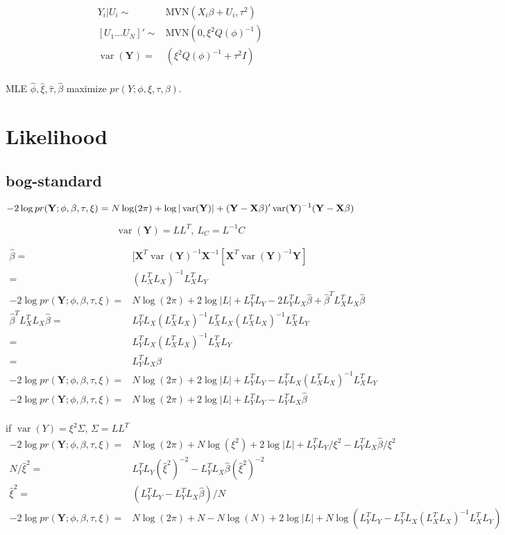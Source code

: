 \documentclass[12pt]{article}
\DeclareMathOperator{\var}{var}
\begin{document}
\begin{align*}
Y_i| U_i \sim & \text{MVN}(X_i\beta + U_i, \tau^2 )\\
[U_1 \ldots U_N]' \sim  & \text{MVN}(0, \xi^2 Q(\phi)^{-1})\\
\var(\mathbf{Y})  = &  ( \xi^2 Q(\phi)^{-1} + \tau^2 I  )  \\
\end{align*}

MLE  $\hat\phi, \hat\xi, \hat\tau,\hat\beta$  maximize $pr(Y ;
\phi,\xi,\tau,\beta)$.

\section*{Likelihood}
\subsection{bog-standard}
\[
-2 \log pr(\mathbf{Y};\phi,\beta,\tau,\xi) = N \log(2\pi) + 
\log| \var(\mathbf{Y})  | + \\
( \mathbf{Y} -\mathbf{X}\beta)  '
  \var(\mathbf{Y})^{-1}
(\mathbf{Y} - \mathbf{X}\beta)
\]

\[	
\var(\mathbf{Y}) = L L^T,\ L_C = L^{-1}C 
\]

\begin{align*}
\hat\beta = &[\mathbf{X}^T
  \var(\mathbf{Y})^{-1} \mathbf{X}^{-1}
  [\mathbf{X}^T
  \var(\mathbf{Y})^{-1} \mathbf{Y}]\\
  = & (L_X^TL_X)^{-1} L_X^TL_Y\\
-2 \log pr(\mathbf{Y};\phi,\beta,\tau,\xi) = &N \log(2\pi) +
2\log| L  | + L_Y^TL_Y -2L_Y^TL_X\hat\beta + \hat\beta^T L_X^TL_X\hat\beta\\
\hat\beta^T  L_X^TL_X\hat\beta = & L_Y^TL_X (L_X^TL_X)^{-1}  L_X^TL_X (L_X^TL_X)^{-1} L_X^TL_Y \\
 = &   L_Y^TL_X (L_X^TL_X)^{-1} L_X^TL_Y \\
= & L_Y^TL_X\hat\beta\\
-2 \log pr(\mathbf{Y};\phi,\beta,\tau,\xi) = &N \log(2\pi) +
2\log| L  | + L_Y^TL_Y -L_Y^TL_X(L_X^TL_X)^{-1} L_X^TL_Y \\
-2 \log pr(\mathbf{Y};\phi,\beta,\tau,\xi) = &N \log(2\pi) +
2\log| L  | + L_Y^TL_Y- L_Y^TL_X\hat\beta\\
\end{align*}

if $\var(Y) = \xi^2 \Sigma$, $\Sigma = L L^T$
\begin{align*}
-2 \log pr(\mathbf{Y};\phi,\beta,\tau,\xi) = &N \log(2\pi) +
N \log(\xi^2) + 2\log| L  | + L_Y^TL_Y/\xi^2 -L_Y^TL_X\hat\beta/\xi^2 \\
N/\hat\xi^2 = &L_Y^TL_Y(\hat\xi^2)^{-2} - L_Y^TL_X\hat\beta(\hat\xi^2)^{-2}\\
\hat\xi^2 = &(L_Y^TL_Y - L_Y^TL_X\hat\beta)/N\\
-2 \log pr(\mathbf{Y};\phi,\beta,\tau,\xi) = &N \log(2\pi) +N- N \log(N) 	+ 2\log| L  | +
N\log(L_Y^TL_Y - L_Y^TL_X(L_X^TL_X)^{-1} L_X^TL_Y)
\end{align*}
\end{document}

